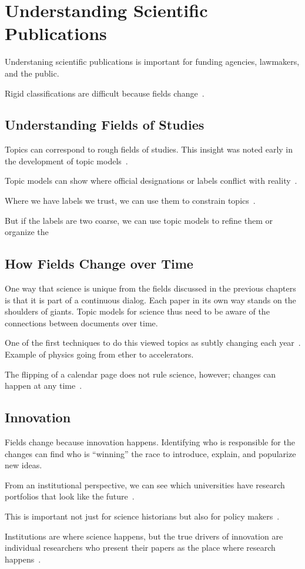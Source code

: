 

\chapter{Understanding Scientific Publications}
\label{ch:sci}

Understaning scientific publications is important for funding
agencies, lawmakers, and the public.

Rigid classifications are difficult because fields
change~\citep{szostak-04}.

\section{Understanding Fields of Studies}

Topics can correspond to rough fields of studies.  This insight was
noted early in the development of topic models~\citep{griffiths-04}.

Topic models can show where official designations or labels conflict
with reality~\citep{talley-11}.

Where we have labels we trust, we can use them to constrain
topics~\citep{ramage-09}.

But if the labels are two coarse, we can use topic models to refine
them or organize the\citep{Nguyen:Boyd-Graber:Resnik:Chang-2014}

\section{How Fields Change over Time}

One way that science is unique from the fields discussed in the
previous chapters is that it is part of a continuous dialog.  Each
paper in its own way stands on the shoulders of giants. Topic models
for science thus need to be aware of the connections between documents
over time.

One of the first techniques to do this viewed topics as subtly
changing each year~\citep{blei-06b}.  Example of physics going from
ether to accelerators.

The flipping of a calendar page does not rule science, however;
changes can happen at any time~\citep{wang-06,wang-08}.

\section{Innovation}

Fields change because innovation happens.  Identifying who is
responsible for the changes can find who is ``winning'' the race to
introduce, explain, and popularize new ideas.

From an institutional perspective, we can see which universities have
research portfolios that look like the future~\citep{ramage-10}.

This is important not just for science historians but also for policy
makers~\citep{largent-12}.

Institutions are where science happens, but the true drivers of
innovation are individual researchers who present their papers as the
place where research happens~\citep{gerrish-10}.
